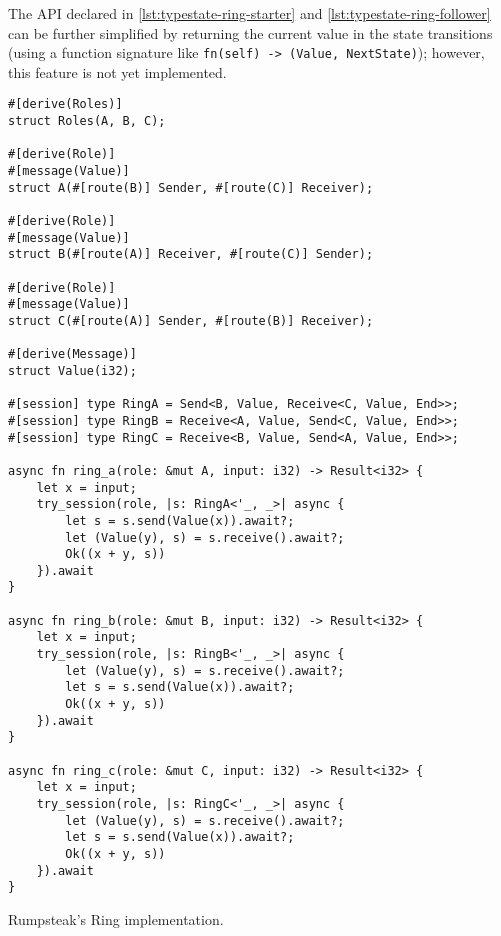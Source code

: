 The API declared in \autoref{lst:typestate-ring-starter} and \autoref{lst:typestate-ring-follower}
can be further simplified by returning the current value in the state transitions
(using a function signature like \texttt{fn(self) -> (Value, NextState)});
however, this feature is not yet implemented.


\begin{listing}
    \centering
    \begin{verbatim}
#[derive(Roles)]
struct Roles(A, B, C);

#[derive(Role)]
#[message(Value)]
struct A(#[route(B)] Sender, #[route(C)] Receiver);

#[derive(Role)]
#[message(Value)]
struct B(#[route(A)] Receiver, #[route(C)] Sender);

#[derive(Role)]
#[message(Value)]
struct C(#[route(A)] Sender, #[route(B)] Receiver);

#[derive(Message)]
struct Value(i32);

#[session] type RingA = Send<B, Value, Receive<C, Value, End>>;
#[session] type RingB = Receive<A, Value, Send<C, Value, End>>;
#[session] type RingC = Receive<B, Value, Send<A, Value, End>>;

async fn ring_a(role: &mut A, input: i32) -> Result<i32> {
    let x = input;
    try_session(role, |s: RingA<'_, _>| async {
        let s = s.send(Value(x)).await?;
        let (Value(y), s) = s.receive().await?;
        Ok((x + y, s))
    }).await
}

async fn ring_b(role: &mut B, input: i32) -> Result<i32> {
    let x = input;
    try_session(role, |s: RingB<'_, _>| async {
        let (Value(y), s) = s.receive().await?;
        let s = s.send(Value(x)).await?;
        Ok((x + y, s))
    }).await
}

async fn ring_c(role: &mut C, input: i32) -> Result<i32> {
    let x = input;
    try_session(role, |s: RingC<'_, _>| async {
        let (Value(y), s) = s.receive().await?;
        let s = s.send(Value(x)).await?;
        Ok((x + y, s))
    }).await
}
    \end{verbatim}
    \caption{Rumpsteak's Ring implementation.}
    \label{lst:rumpsteak-ring}
\end{listing}

